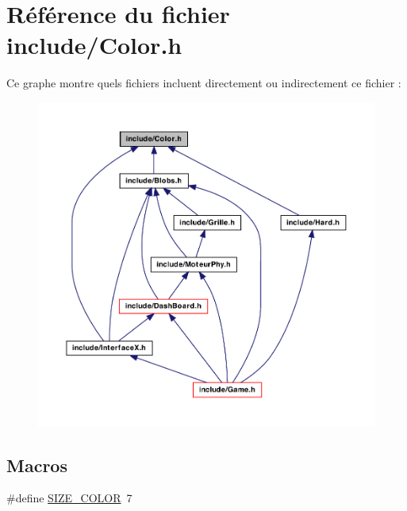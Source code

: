 \hypertarget{a00019}{
\section{Référence du fichier include/Color.h}
\label{a00019}
}
Ce graphe montre quels fichiers incluent directement ou indirectement ce fichier :
\nopagebreak
\begin{figure}[H]
\begin{center}
\leavevmode
\includegraphics[width=400pt]{a00044}
\end{center}
\end{figure}
\subsection*{Macros}
\begin{DoxyCompactItemize}
\item 
\#define \hyperlink{a00019_a442be7a0863fb7165d1043f3de8fff8e}{SIZE\_\-COLOR}~7
\end{DoxyCompactItemize}
